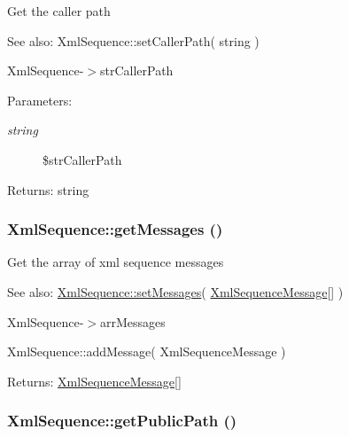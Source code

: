 Get the caller path

\begin{Desc}
\item[See also:]XmlSequence::setCallerPath( string ) 

XmlSequence-$>$strCallerPath \end{Desc}
\begin{Desc}
\item[Parameters:]
\begin{description}
\item[{\em string}]\$strCallerPath \end{description}
\end{Desc}
\begin{Desc}
\item[Returns:]string \end{Desc}
\hypertarget{class_xml_sequence_21cc38a9b7b19954bb0b8951b065ad11}{
\subsubsection[{getMessages}]{\setlength{\rightskip}{0pt plus 5cm}XmlSequence::getMessages ()}}
\label{class_xml_sequence_21cc38a9b7b19954bb0b8951b065ad11}


Get the array of xml sequence messages

\begin{Desc}
\item[See also:]\hyperlink{class_xml_sequence_3cf549fbc588fc2bc0bbd74f818dfe91}{XmlSequence::setMessages}( \hyperlink{class_xml_sequence_message}{XmlSequenceMessage}\mbox{[}\mbox{]} ) 

XmlSequence-$>$arrMessages 

XmlSequence::addMessage( XmlSequenceMessage ) \end{Desc}
\begin{Desc}
\item[Returns:]\hyperlink{class_xml_sequence_message}{XmlSequenceMessage}\mbox{[}\mbox{]} \end{Desc}
\hypertarget{class_xml_sequence_156bcaa4792dca6a381621d68052ba32}{
\subsubsection[{getPublicPath}]{\setlength{\rightskip}{0pt plus 5cm}XmlSequence::getPublicPath ()}}
\label{class_xml_sequence_156bcaa4792dca6a381621d68052ba32}


